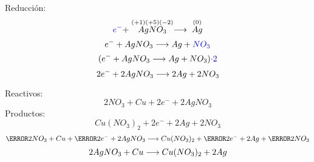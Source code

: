 \documentclass[../Práctica.root.tex]{subfiles}
\begin{document}
\begin{enumerate}
\begin{enumerate}
\begin{multicols}{2}
                        \columnbreak

                        Reducción:
                        \[ \textcolor{blue}{e^-} + \stackrel{(+1)(+5)(-2)}{AgNO_3} \longrightarrow{} \stackrel{(0)}{Ag} \]
                        \[ e^- + AgNO_3 \longrightarrow{} Ag + \textcolor{blue}{NO_3} \]
                        \[ (e^- + AgNO_3 \longrightarrow{} Ag + NO_3)\textcolor{blue}{\cdot 2} \]
                        \[ 2 e^- + 2 AgNO_3 \longrightarrow{} 2 Ag + 2 NO_3 \]
                    \end{multicols}


                    Reactivos:
                    \[ 2 NO_3 + Cu + 2 e^- + 2 AgNO_3 \]
                    Productos:
                    \[ Cu(NO_3)_2 + 2 e^- + 2 Ag + 2 NO_3 \]
                    \[ \cancel{2 NO_3} + Cu + \cancel{2 e^-} + 2 AgNO_3 \lra Cu(NO_3)_2 + \cancel{2 e^-} + 2 Ag + \cancel{2 NO_3} \]
                    \[ 2 AgNO_3 + Cu \longrightarrow{} Cu(NO_3)_2 + 2 Ag \]
          \end{enumerate}
\end{enumerate}
\end{document}
